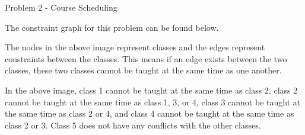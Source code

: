 \begin{problem}{Problem 2 - Course Scheduling}
    \begin{highlight}
        The constraint graph for this problem can be found below.

        \begin{center}
        \end{center}
        The nodes in the above image represent classes and the edges represent constraints between the classes. This means if an edge exists between the two classes, these two classes cannot be taught
        at the same time as one another.

        In the above image, class 1 cannot be taught at the same time as class 2, class 2 cannot be taught at the same time as class 1, 3, or 4, class 3 cannot be taught at the same time as class 2 or 4,
        and class 4 cannot be taught at the same time as class 2 or 3. Class 5 does not have any conflicts with the other classes.
    \end{highlight}
\end{problem}

